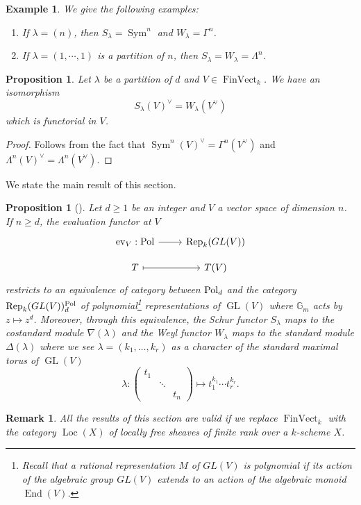 \documentclass[11pt]{amsart}
\numberwithin{subsection}{section}
\numberwithin{figure}{section}
\numberwithin{table}{section}
\theoremstyle{1}
\newtheorem{proposition}[theorem]{Proposition}
\theoremstyle{2}
\newtheorem{example}[theorem]{Example}
\newtheorem{rmrk}[theorem]{Remark}
\DeclareMathOperator{\FinVect}{FinVect}
\DeclareMathOperator{\Rep}{Rep}
\DeclareMathOperator{\GL}{GL}
\DeclareMathOperator{\Sym}{Sym}
\DeclareMathOperator{\Loc}{Loc}
\DeclareMathOperator{\ev}{ev}
\DeclareMathOperator{\Pol}{\normalfont \textsf{Pol}}
\DeclareMathOperator{\End}{End}
\begin{document}
\begin{example}
We give the following examples:
\begin{enumerate}
\item If $\lambda = (n)$, then $S_\lambda = \Sym^n$ and $W_\lambda = \Gamma^n$. 
\item If $\lambda = (1,\cdots,1)$ is a partition of $n$, then  $S_\lambda = W_\lambda = \Lambda^n$.
\end{enumerate}
\end{example}
\begin{proposition}
Let $\lambda$ be a partition of $d$ and $V \in \FinVect_k$. We have an isomorphism
\begin{equation*}
{S_{\lambda}(V)}^{\vee} = W_\lambda(V^{\vee})
\end{equation*}
which is functorial in $V$.
\end{proposition}
\begin{proof}
Follows from the fact that $\Sym^n(V)^{\vee}  = \Gamma^n(V^{\vee})$ and $\Lambda^n(V)^{\vee}  = \Lambda^n(V^{\vee})$.
\end{proof}
\vspace*{0.2cm}
We state the main result of this section.
\begin{proposition}[{\cite[Lemma 3.4]{MR1427618}}]\label{prop_eval}
Let $d \geq 1$ be an integer and $V$ a vector space of dimension $n$. If $n\geq d$, the evaluation functor at $V$
\begin{equation*}
\begin{tikzcd}[row sep =small]
\ev_V : \Pol \arrow[r] & \Rep_k(GL(V)) \\
T \arrow[r,mapsto] & T(V)
\end{tikzcd}
\end{equation*}
restricts to an equivalence of category between $\Pol_d$ and the category $\Rep_k(GL(V))^{\Pol}_d$ of polynomial\footnote{Recall that a rational representation $M$ of $GL(V)$ is polynomial if its action of the algebraic group $GL(V)$ extends to an action of the algebraic monoid $\End(V)$.} representations of $\GL(V)$ where $\mathbb{G}_m$ acts by $z \mapsto z^d$. Moreover, through this equivalence, the Schur functor $S_\lambda$ maps to the costandard module $\nabla(\lambda)$ and the Weyl functor $W_\lambda$ maps to the standard module $\Delta(\lambda)$ where we see $\lambda = (k_1, \ldots, k_r)$ as a character of the standard maximal torus of $\GL(V)$
\begin{equation*}
\lambda : \begin{pmatrix}
t_1 & & \\
& \ddots & \\
& & t_n
\end{pmatrix} \mapsto t_1^{k_1} \cdots t_r^{k_r}.
\end{equation*}
\end{proposition}
\begin{rmrk}
All the results of this section are valid if we replace $\FinVect_k$ with the category $\Loc(X)$ of locally free sheaves of finite rank over a $k$-scheme $X$.
\end{rmrk}
\end{document}
